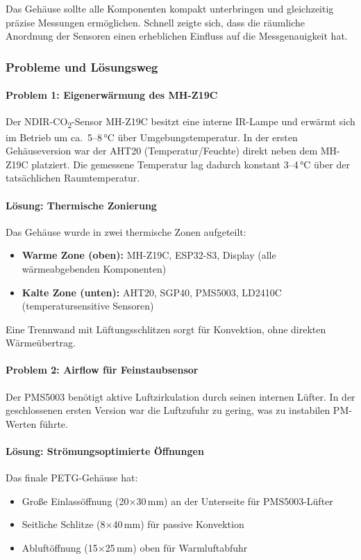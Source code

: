 Das Gehäuse sollte alle Komponenten kompakt unterbringen und gleichzeitig präzise Messungen ermöglichen. Schnell zeigte sich, dass die räumliche Anordnung der Sensoren einen erheblichen Einfluss auf die Messgenauigkeit hat.

\subsubsection{Probleme und Lösungsweg}

\paragraph{Problem 1: Eigenerwärmung des MH-Z19C}
Der NDIR-CO\textsubscript{2}-Sensor MH-Z19C besitzt eine interne IR-Lampe und erwärmt sich im Betrieb um ca.\ 5--8\,°C über Umgebungstemperatur. In der ersten Gehäuseversion war der AHT20 (Temperatur/Feuchte) direkt neben dem MH-Z19C platziert. Die gemessene Temperatur lag dadurch konstant 3--4\,°C über der tatsächlichen Raumtemperatur.

\paragraph{Lösung: Thermische Zonierung}
Das Gehäuse wurde in zwei thermische Zonen aufgeteilt:
\begin{itemize}[nosep]
\item \textbf{Warme Zone (oben):} MH-Z19C, ESP32-S3, Display (alle wärmeabgebenden Komponenten)
\item \textbf{Kalte Zone (unten):} AHT20, SGP40, PMS5003, LD2410C (temperatursensitive Sensoren)
\end{itemize}

Eine Trennwand mit Lüftungsschlitzen sorgt für Konvektion, ohne direkten Wärmeübertrag.

\paragraph{Problem 2: Airflow für Feinstaubsensor}
Der PMS5003 benötigt aktive Luftzirkulation durch seinen internen Lüfter. In der geschlossenen ersten Version war die Luftzufuhr zu gering, was zu instabilen PM-Werten führte.

\paragraph{Lösung: Strömungsoptimierte Öffnungen}
Das finale PETG-Gehäuse hat:
\begin{itemize}[nosep]
\item Große Einlassöffnung (20$\times$30\,mm) an der Unterseite für PMS5003-Lüfter
\item Seitliche Schlitze (8$\times$40\,mm) für passive Konvektion
\item Abluftöffnung (15$\times$25\,mm) oben für Warmluftabfuhr
\end{itemize}


